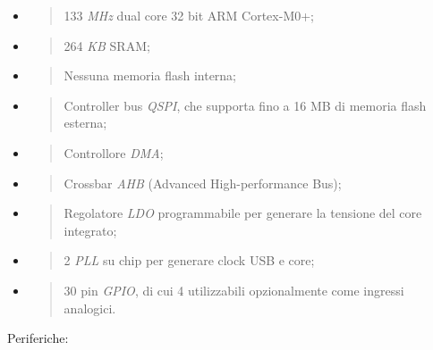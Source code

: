 \begin{itemize}
\item
  \begin{quote}
  133 \emph{MHz} dual core 32 bit ARM Cortex-M0+;
  \end{quote}
\item
  \begin{quote}
  264 \emph{KB} SRAM;
  \end{quote}
\item
  \begin{quote}
  Nessuna memoria flash interna;
  \end{quote}
\item
  \begin{quote}
  Controller bus \emph{QSPI}, che supporta fino a 16 MB di memoria flash
  esterna;
  \end{quote}
\item
  \begin{quote}
  Controllore \emph{DMA};
  \end{quote}
\item
  \begin{quote}
  Crossbar \emph{AHB} (Advanced High-performance Bus);
  \end{quote}
\item
  \begin{quote}
  Regolatore \emph{LDO} programmabile per generare la tensione del core
  integrato;
  \end{quote}
\item
  \begin{quote}
  2 \emph{PLL} su chip per generare clock USB e core;
  \end{quote}
\item
  \begin{quote}
  30 pin \emph{GPIO}, di cui 4 utilizzabili opzionalmente come ingressi
  analogici.
  \end{quote}
\end{itemize}

\noindent Periferiche:

